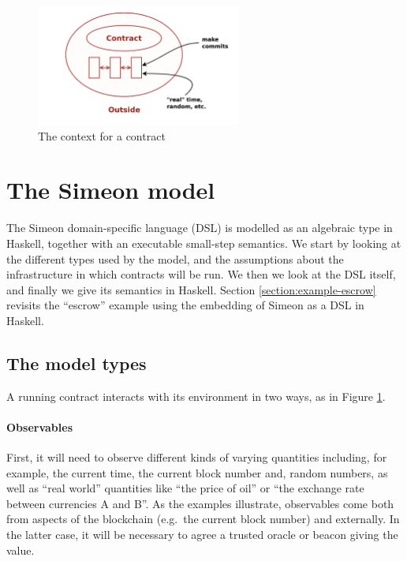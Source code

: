 \documentclass[runningheads]{llncs}
\begin{document}
\begin{figure}[t]
\begin{center}
\includegraphics[width=0.6\textwidth]{pix/context.png}
\caption{The context for a contract}
\label{fig:context}
\end{center}
\vspace*{-8mm}
\end{figure}


\section{The Simeon model}
\label{section:model}

The Simeon domain-specific language (DSL) is modelled as an algebraic type in Haskell, together with an executable 
small-step semantics. We start by looking at the different types used by the model, and the assumptions about the 
infrastructure in which contracts will be run. We then we look at the  DSL itself, 
and finally we give its semantics in Haskell. Section 
\ref{section:example-escrow} revisits the ``escrow'' example using the embedding of Simeon as a DSL in Haskell.

\subsection{The model types}

A running contract interacts with its environment in two ways, as in Figure \ref{fig:context}.

\paragraph{Observables}


First, it will need to observe different kinds of varying quantities including, for example, the current time, the 
current block number and, random numbers, as well as ``real world'' quantities like ``the price of oil'' or ``the 
exchange rate between currencies A and B''. 
As the examples illustrate, observables come both from aspects of the blockchain (e.g.\ the current block number) and 
externally. In the latter case, it will be necessary to agree a trusted oracle or beacon giving the value.
\end{document}
